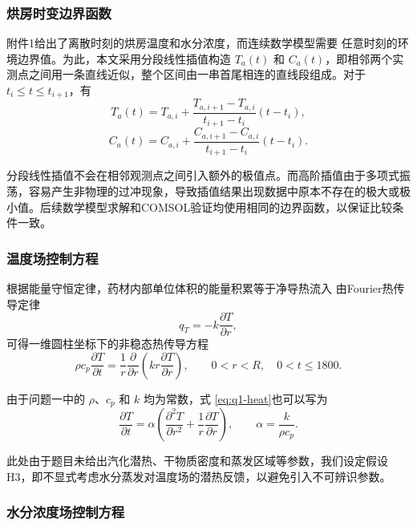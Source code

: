 \documentclass[12pt,a4paper]{article}
\renewcommand{\boxed}[1]{#1}
\begin{document}
\begin{center}
\subsubsection{烘房时变边界函数}

附件1给出了离散时刻的烘房温度和水分浓度，而连续数学模型需要
任意时刻的环境边界值。为此，本文采用分段线性插值构造
$T_a(t)$ 和 $C_a(t)$，即相邻两个实测点之间用一条直线近似，整个区间由一串首尾相连的直线段组成。对于 $t_i\le t\le t_{i+1}$，有
\begin{equation}
T_a(t)
=
T_{a,i}
+
\frac{T_{a,i+1}-T_{a,i}}{t_{i+1}-t_i}
(t-t_i),
\end{equation}
\begin{equation}
C_a(t)
=
C_{a,i}
+
\frac{C_{a,i+1}-C_{a,i}}{t_{i+1}-t_i}
(t-t_i).
\end{equation}

分段线性插值不会在相邻观测点之间引入额外的极值点。而高阶插值由于多项式振荡，容易产生非物理的过冲现象，导致插值结果出现数据中原本不存在的极大或极小值。后续数学模型求解和COMSOL验证均使用相同的边界函数，以保证比较条件一致。

\subsubsection{温度场控制方程}

根据能量守恒定律，药材内部单位体积的能量积累等于净导热流入
由Fourier热传导定律
\begin{equation}
q_T=-k\frac{\partial T}{\partial r},
\end{equation}
可得一维圆柱坐标下的非稳态热传导方程
\begin{equation}
\boxed{
\rho c_p\frac{\partial T}{\partial t}
=
\frac{1}{r}
\frac{\partial}{\partial r}
\left(
kr\frac{\partial T}{\partial r}
\right)
},
\qquad
0<r<R,\quad 0<t\le1800.
\label{eq:q1-heat}
\end{equation}

由于问题一中的 $\rho$、$c_p$ 和 $k$ 均为常数，式
\eqref{eq:q1-heat}也可以写为
\begin{equation}
\frac{\partial T}{\partial t}
=
\alpha
\left(
\frac{\partial^2T}{\partial r^2}
+
\frac{1}{r}\frac{\partial T}{\partial r}
\right),
\qquad
\alpha=\frac{k}{\rho c_p}.
\end{equation}

此处由于题目未给出汽化潜热、干物质密度和蒸发区域等参数，我们设定假设H3，即不显式考虑水分蒸发对温度场的潜热反馈，以避免引入不可辨识参数。

\subsubsection{水分浓度场控制方程}


\end{center}
\end{document}
